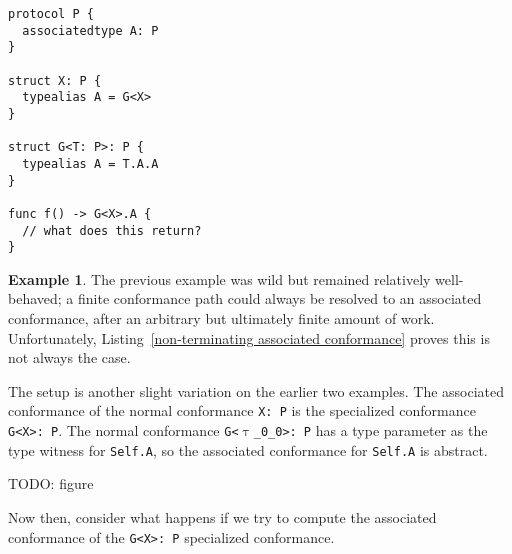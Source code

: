\documentclass[a4paper,headsepline,bibliography=totoc,toc=flat,fleqn,twoside=semi]{scrbook}
\theoremstyle{definition}
\theoremstyle{definition}
\newtheorem{example}{Example}[chapter]
\theoremstyle{definition}
\newcommand{\ttgp}[2]{\texttt{$\uptau$\_#1\_#2}}
\begin{document}
\begin{listing}\label{non-terminating associated conformance}
\begin{Verbatim}
protocol P {
  associatedtype A: P
}

struct X: P {
  typealias A = G<X>
}

struct G<T: P>: P {
  typealias A = T.A.A
}

func f() -> G<X>.A {
  // what does this return?
}
\end{Verbatim}
\end{listing}

\begin{example}
The previous example was wild but remained relatively well-behaved; a finite conformance path could always be resolved to an associated conformance, after an arbitrary but ultimately finite amount of work. Unfortunately, Listing~\ref{non-terminating associated conformance} proves this is not always the case.

The setup is another slight variation on the earlier two examples. The associated conformance of the normal conformance \texttt{X:\ P} is the specialized conformance \texttt{G<X>:\ P}. The normal conformance \texttt{G<\ttgp{0}{0}>:\ P} has a type parameter as the type witness for \texttt{Self.A}, so the associated conformance for \texttt{Self.A} is abstract.

TODO: figure

Now then, consider what happens if we try to compute the associated conformance of the \texttt{G<X>:\ P} specialized conformance.


\end{example}
\end{document}
